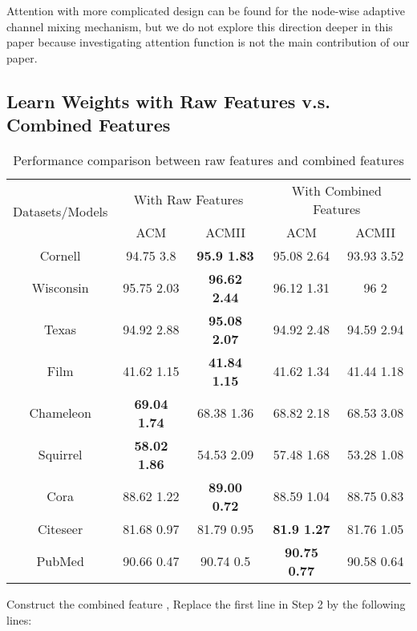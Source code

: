 \documentclass{article}
\newcommand{\0}{{\boldsymbol{0}}}
\newcommand{\6}{{\partial}}
\newcommand{\8}{{\infty}}
\newcommand{\4}{{\nabla}}
\begin{document}
Attention with more complicated design can be found for the node-wise adaptive channel mixing mechanism, but we do not explore this direction deeper in this paper because investigating attention function is not the main contribution of our paper.

\subsection{Learn Weights with Raw Features v.s. Combined Features}
\label{appendix:raw_combined_feature_comparison}

\begin{table}[htbp]
  \centering
  \caption{Performance comparison between raw features and combined features}
    \begin{tabular}{c|cccc}
    \toprule
    \toprule
    \multirow{2}[4]{*}{Datasets/Models} & \multicolumn{2}{c|}{With Raw Features} & \multicolumn{2}{c}{With Combined Features} \\
\cmidrule{2-5}          & ACM   & \multicolumn{1}{c|}{ACMII} & ACM   & ACMII \\
    \midrule
    Cornell & 94.75  3.8 & \multicolumn{1}{c|}{\cellcolor[rgb]{ .647,  .647,  .647}\textbf{95.9  1.83}} & 95.08  2.64 & 93.93  3.52 \\
    Wisconsin & 95.75  2.03 & \multicolumn{1}{c|}{\cellcolor[rgb]{ .647,  .647,  .647}\textbf{96.62  2.44}} & 96.12  1.31 & 96  	2 \\
    Texas & 94.92  2.88 & \multicolumn{1}{c|}{\cellcolor[rgb]{ .647,  .647,  .647}\textbf{95.08  2.07}} & 94.92  2.48 & 94.59  2.94 \\
    Film  & 41.62  1.15 & \multicolumn{1}{c|}{\cellcolor[rgb]{ .647,  .647,  .647}\textbf{41.84  1.15}} & 41.62  1.34 & 41.44  1.18 \\
    Chameleon & \cellcolor[rgb]{ .647,  .647,  .647}\textbf{69.04  1.74} & \multicolumn{1}{c|}{68.38  1.36} & 68.82  2.18 & 68.53  3.08 \\
    Squirrel & \cellcolor[rgb]{ .647,  .647,  .647}\textbf{58.02  1.86} & \multicolumn{1}{c|}{54.53  2.09} & 57.48  1.68 & 53.28  1.08 \\
    Cora  & 88.62  1.22 & \multicolumn{1}{c|}{\cellcolor[rgb]{ .647,  .647,  .647}\textbf{89.00  0.72}} & 88.59  1.04 & 88.75  0.83 \\
    Citeseer & 81.68  0.97 & 81.79  0.95 & \cellcolor[rgb]{ .647,  .647,  .647}\textbf{81.9  1.27} & 81.76  1.05 \\
    PubMed & 90.66  0.47 & 90.74  0.5 & \cellcolor[rgb]{ .647,  .647,  .647}\textbf{90.75  0.77 } & 90.58  0.64 \\
    \bottomrule
    \bottomrule
    \end{tabular}\label{tab:raw_combined_feature_comparison}\end{table} Construct the combined feature , 
Replace the first line in Step 2 by the following lines:
\end{document}
